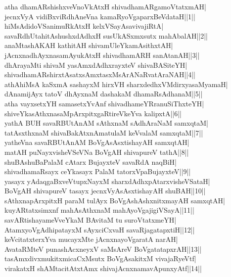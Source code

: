 \documentclass{article}
\begin{document}
atha dhamARshishxveVnoVkAtxH shivadhamARgamoVtatxmAH|\\
jecnxVyA vidiBxviRdhAneVna kamaRyoVgaparxBeVdataH||1||\\
hiMsAdidoVSanimuRkAtxH kelxVSayAsavivajiRtA|\\
savaRdhUtahitAshushxdAdhxH susUkASxmxsutx mahAbalAH||2||\\
anaMtashAKAH kathitAH shivamUleYkamAsithxtAH|\\
jAcnxnadhAyxnasamAyukAtxH shivadhamARH sanAtanAH||3||\\
dhArayaMti shivaM yasAmxdAdhxrayxteV shivaBASiteYH|\\
shivadhamARshirxtAsatxsAmxtasxMsArANaRvatAraNAH||4||\\
athAhiMsA kaSxmA sashayxM hirxVH sharxdedhxVMdirxyasaMyamaH|\\
dAnamijAyx tatoV dhAyxnaM dashakaM dhamaRsAdhanaM||5||\\
atha vayxsetxYH samasetxYvAnf shivadhameYRranuSiThxteYH|\\
shiveYkasAthxnasaMpArxpitxgaRtireVkeYva kalipxtA||6||\\
yathA BUH savaRBUtAnAM sAthxnaM sAdhAraNaM samxqtaM|\\
tatAsxthxnaM shivaBakAtxnAmatulaM keVvalaM samxqtaM||7||\\
yatheVna savaRBUtAnAM BoVgAsAsxtishayAH samxqtAH|\\
matAH puNayxvisheVSeVNa BoVgAH shivapureV tathA||8||\\
shuBAshuBaPalaM cAtarx BujayxteV savaRdA naqBiH|\\
shivadhamaRsayx ceYkasayx PalaM tatorxVpaBujayxteV||9||\\
yasayx yAdaqgaBxveVtupxNayxM sharxdAdhxpAtarxvisheVSataH|\\
BoVgAH shivapureV tasayx jecnxVyAsAsxtishayAH shuBAH||10||\\
sAthxnapArxpitxH paraM tulAyx BoVgAshAshxnitxmayAH samxqtAH|\\
kuyARtatxsimxnf mahAsAthxnaM mahAyoVgajigiVSayA||11||\\
savARtishayameVveYkaM BAvitaM tu suroVtatxmeYH|\\
AtamxyoVgAdhipatayxM sAyxciCxvaH savaRjagatapxtiH||12||\\
keVcitatxterxYva mucayxMte jAcnxnayoVgaratA narAH|\\
AvataRMteV punashAcxneyxV saMsAreV BoVgatatapxrAH||13||\\
tasAmxdivxmukitxmicaCxMsutx BoVgAsakitxM vivajaRyeVtf|\\
virakatxH shAMtacitAtxtAmx shivajAcnxnamavApunxyAtf||14||\\
\end{document}
